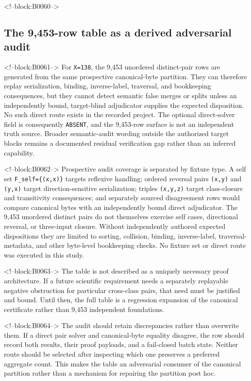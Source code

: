 \documentclass[11pt]{article}
\begin{document}
<!--block:B0060-->
\hypertarget{43-the-9453-row-table-as-a-derived-adversarial-audit}{%
\subsection{The 9,453-row table as a derived adversarial
audit}\label{43-the-9453-row-table-as-a-derived-adversarial-audit}}

<!--block:B0061-->
For \texttt{\textbar{}X\textbar{}=138}, the 9,453 unordered distinct-pair
rows are generated from the same prospective canonical-byte partition. They
can therefore replay serialization, binding, inverse-label, traversal, and
bookkeeping consequences, but they cannot detect semantic false merges or
splits unless an independently bound, target-blind adjudicator supplies the
expected disposition. No such direct route exists in the recorded project.
The optional direct-solver field is consequently \texttt{ABSENT}, and the
9,453-row surface is not an independent truth source. Broader semantic-audit
wording outside the authorized target blocks remains a documented residual
verification gap rather than an inferred capability.

<!--block:B0062-->
Prospective audit coverage is separated by fixture type. A self set
\texttt{F\_self=\{(x,x)\}} targets reflexive handling; ordered reversal pairs
\texttt{(x,y)} and \texttt{(y,x)} target direction-sensitive serialization;
triples \texttt{(x,y,z)} target class-closure and transitivity consequences;
and separately sourced disagreement rows would compare canonical bytes with
an independently bound direct adjudicator. The 9,453 unordered distinct pairs
do not themselves exercise self cases, directional reversal, or three-input
closure. Without independently authored expected dispositions they are limited
to sorting, collision, binding, inverse-label, traversal-metadata, and other
byte-level bookkeeping checks. No fixture set or direct route was executed in
this study.

<!--block:B0063-->
The table is not described as a uniquely necessary proof architecture.
If a future scientific requirement needs a separately replayable
negative obstruction for particular cross-class pairs, that need must be
justified and bound. Until then, the full table is a regression
expansion of the canonical certificate rather than 9,453 independent
foundations.

<!--block:B0064-->
The audit should retain discrepancies rather than overwrite them. If a
direct pair solver and canonical-byte equality disagree, the row should
record both results, their proof payloads, and a fail-closed batch state.
Neither route should be selected after inspecting which one preserves a
preferred aggregate count. This makes the table an adversarial consumer
of the canonical partition rather than a mechanism for repairing the
partition post hoc.
\end{document}
